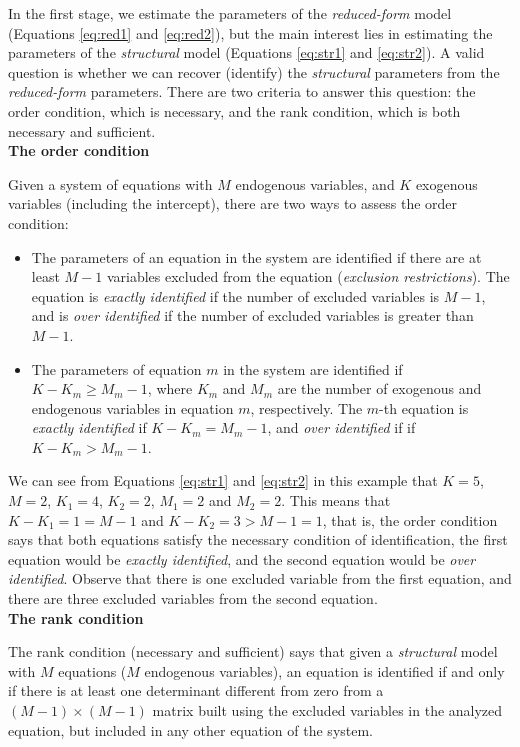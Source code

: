 In the first stage, we estimate the parameters of the \textit{reduced-form} model (Equations \ref{eq:red1} and \ref{eq:red2}), but the main interest lies in estimating the parameters of the \textit{structural} model (Equations \ref{eq:str1} and \ref{eq:str2}). A valid question is whether we can recover (identify) the \textit{structural} parameters from the \textit{reduced-form} parameters. There are two criteria to answer this question: the order condition, which is necessary, and the rank condition, which is both necessary and sufficient.\\
 
\textbf{The order condition}

Given a system of equations with $M$ endogenous variables, and $K$ exogenous variables (including the intercept), there are two ways to assess the order condition:
\begin{itemize}
	\item The parameters of an equation in the system are identified if there are at least $M-1$ variables excluded from the equation (\textit{exclusion restrictions}). The equation is \textit{exactly identified} if the number of excluded variables is $M-1$, and is \textit{over identified} if the number of excluded variables is greater than $M-1$.
	\item The parameters of equation $m$ in the system are identified if $K-K_m\geq M_m-1$, where $K_m$ and $M_m$ are the number of exogenous and endogenous variables in equation $m$, respectively. The $m$-th equation is \textit{exactly identified} if $K-K_m = M_m-1$, and \textit{over identified} if if $K-K_m > M_m-1$. 
\end{itemize}

We can see from Equations \ref{eq:str1} and \ref{eq:str2} in this example that $K=5$, $M=2$, $K_1=4$, $K_2=2$, $M_1=2$ and $M_2=2$. This means that $K-K_1=1=M-1$ and $K-K_2=3>M-1=1$, that is, the order condition says that both equations satisfy the necessary condition of identification, the first equation would be \textit{exactly identified}, and the second equation would be \textit{over identified}. Observe that there is one excluded variable from the first equation, and there are three excluded variables from the second equation.
\\

\textbf{The rank condition}

The rank condition (necessary and sufficient) says that given a \textit{structural} model with $M$ equations ($M$ endogenous variables), an equation is identified if and only if there is at least one determinant different from zero from a $(M-1)\times(M-1)$ matrix built using the excluded variables in the analyzed equation, but included in any other equation of the system.

